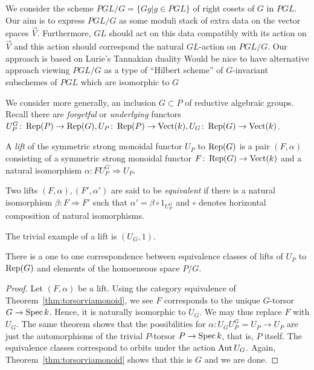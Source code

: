 \documentclass[12pt]{amsart}
\begin{document}
We consider the scheme $PGL/G = \{Gg| g \in PGL\}$ of right cosets of $G$ in $PGL$. Our aim is to express $PGL/G$ as some moduli stack of extra data on the vector spaces $\vec{V}$. Furthermore, $GL$ should act on this data compatibly with its action on $\vec{V}$ and this action should correspond the natural $GL$-action on $PGL/G$. Our approach is based on Lurie's Tannakian duality {\red Would be nice to have alternative approach viewing $PGL/G$ as a type of ``Hilbert scheme'' of $G$-invariant subschemes of $PGL$ which are isomorphic to $G$}

We consider more generally, an inclusion $G \subset P$ of reductive algebraic groups. Recall there are {\em forgetful} or {\em underlying} functors $U^G_P \colon \operatorname{Rep}(P) \to \operatorname{Rep}(G), U_P \colon \operatorname{Rep}(P) \to \text{Vect}(k), U_G \colon \operatorname{Rep}(G) \to \text{Vect}(k)$. 
\begin{definition}  \label{defn:liftmonoidal}
A {\em lift} of the symmetric strong monoidal functor $U_P$ to $\operatorname{Rep}(G)$ is a pair $(F,\alpha)$ consisting of a symmetric strong monoidal functor $F \colon \operatorname{Rep}(G) \to \textup{Vect}(k)$ and a natural isomorphism $\alpha \colon F U^G_P \Rightarrow U_P$.

Two lifts $(F,\alpha),(F',\alpha')$ are said to be {\em equivalent} if there is a natural isomorphism $\beta \colon F \Rightarrow F'$ such that $\alpha' = \beta \circ 1_{U^G_P}$ and $\circ$ denotes horizontal composition of natural isomorphisms. 
\end{definition}

The trivial example of a lift is $(U_G,1)$. 

\begin{proposition}  \label{prop:cosetsaslifts}
There is a one to one correspondence between equivalence classes of lifts of $U_P$ to $\operatorname{Rep}(G)$ and elements of the homoeneous space $P/G$. 
\end{proposition}
\begin{proof}
Let $(F,\alpha)$ be a lift. Using the category equivalence of  Theorem~\ref{thm:torsorviamonoid}, we see $F$ corresponds to the unique $G$-torsor $G \to \operatorname{Spec} k$. Hence, it is naturally isomorphic to $U_G$. We may thus replace $F$ with $U_G$. The same theorem shows that the possibilities for $\alpha \colon U_G U^G_P = U_P \to U_P$ are just the automorphisms of the trivial $P$-torsor $P \to \operatorname{Spec} k$, that is, $P$ itself. The equivalence classes correspond to orbits under the action $\operatorname{Aut} U_G$. Again, Theorem~\ref{thm:torsorviamonoid} shows that this is $G$ and we are done. 
\end{proof}
\end{document}
